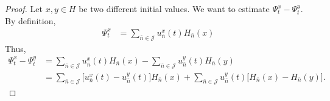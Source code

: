 \documentclass[review, onefignum, onetabnum]{siamart171218}
\begin{document}
\begin{proof}
Let $x,y\in H$ be two different initial values. We want to estimate 
$\Psi_t^x-\Psi_t^y$. By definition,
\begin{align}
\Psi_t^x&=\sum_{\bar n\in \mathcal{J}} u_{\bar n}^x(t)H_{\bar n}(x)
\end{align}
Thus,
%
\begin{equation}
    \label{s3.4}
    \begin{aligned}
        \Psi_t^x-\Psi_t^y
        &=
            \sum_{\bar n\in \mathcal{J}} 
                u_{\bar n}^x(t)H_{\bar n}(x)
            -
            \sum_{\bar n\in \mathcal{J}} 
                u_{\bar n}^y(t)H_{\bar n}(y)
       \\
        &= 
            \sum_{\bar n\in \mathcal{J}} 
                \Big[ u_{\bar n}^x(t )- u_{\bar n}^y(t)
                \Big]H_{\bar n}(x) 
            +
            \sum_{\bar n\in \mathcal{J}} 
                u_{\bar n}^y(t)
                \Big[ 
                    H_{\bar n}(x) - H_{\bar n}(y)  
                \Big].
    \end{aligned}
\end{equation}


\end{proof}
\end{document}
